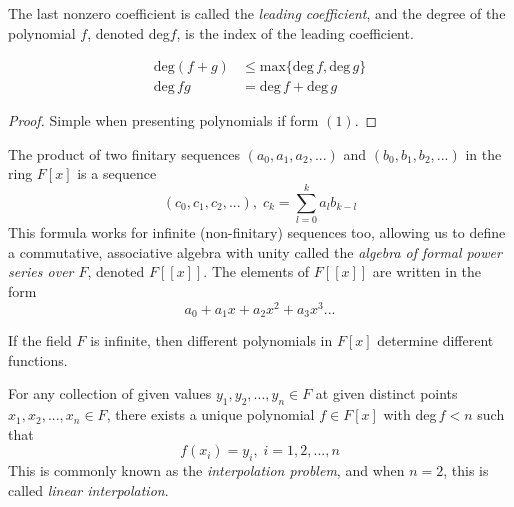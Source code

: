\documentclass{article}
\begin{document}
      \begin{definition}
        The last nonzero coefficient is called the \textit{leading coefficient}, and the degree of the polynomial $f$, denoted deg$f$, is the index of the leading coefficient. 
      \end{definition}

      \begin{theorem}
      \begin{align}
        \text{deg}(f+g) & \leq \text{max}\{\text{deg}\,f, \text{deg} \,g\} \\
        \text{deg} \,f g & = \text{deg} \,f + \text{deg} \,g
      \end{align}
      \end{theorem}
      \begin{proof}
        Simple when presenting polynomials if form $(1)$. 
      \end{proof}

      \begin{definition}
        The product of two finitary sequences $(a_0, a_1, a_2, ...)$ and $(b_0, b_1, b_2, ...)$ in the ring $F[x]$ is a sequence 
        \begin{equation}
          (c_0, c_1, c_2, ...), \; c_k = \sum_{l = 0}^{k} a_l b_{k-l}
        \end{equation}
        This formula works for infinite (non-finitary) sequences too, allowing us to define a commutative, associative algebra with unity called the \textit{algebra of formal power series over $F$}, denoted $F[[x]]$. The elements of $F[[x]]$ are written in the form 
        \begin{equation}
          a_0 + a_1 x + a_2 x^2 + a_3 x^3...
        \end{equation}
      \end{definition}

      \begin{theorem}
        If the field $F$ is infinite, then different polynomials in $F[x]$ determine different functions. 
      \end{theorem}

      \begin{theorem}
        For any collection of given values $y_1, y_2, ..., y_n \in F$ at given distinct points $x_1, x_2, ..., x_n \in F$, there exists a unique polynomial $f \in F[x]$ with deg$\, f < n$ such that
        \begin{equation}
          f(x_i) = y_i, \; i = 1, 2, ..., n
        \end{equation}
        This is commonly known as the \textit{interpolation problem}, and when $n = 2$, this is called \textit{linear interpolation}. 
      \end{theorem}
\end{document}
